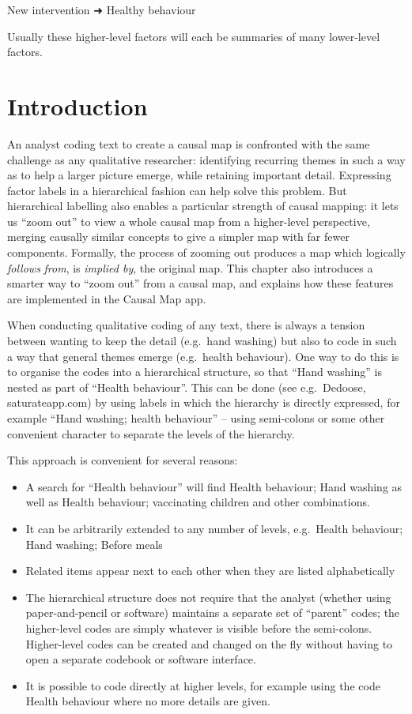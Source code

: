 \documentclass[
]{book}
\begin{document}
New intervention ➜ Healthy behaviour

Usually these higher-level factors will each be summaries of many lower-level factors.

\hypertarget{introduction}{%
\section{Introduction}\label{introduction}}

An analyst coding text to create a causal map is confronted with the same challenge as any qualitative researcher: identifying recurring themes in such a way as to help a larger picture emerge, while retaining important detail. Expressing factor labels in a hierarchical fashion can help solve this problem. But hierarchical labelling also enables a particular strength of causal mapping: it lets us ``zoom out'' to view a whole causal map from a higher-level perspective, merging causally similar concepts to give a simpler map with far fewer components. Formally, the process of zooming out produces a map which logically \emph{follows} \emph{from}, is \emph{implied by}, the original map. This chapter also introduces a smarter way to ``zoom out'' from a causal map, and explains how these features are implemented in the Causal Map app.

When conducting qualitative coding of any text, there is always a tension between wanting to keep the detail (e.g.~hand washing) but also to code in such a way that general themes emerge (e.g.~health behaviour). One way to do this is to organise the codes into a hierarchical structure, so that ``Hand washing'' is nested as part of ``Health behaviour''. This can be done (see e.g.~Dedoose, saturateapp.com) by using labels in which the hierarchy is directly expressed, for example ``Hand washing; health behaviour'' -- using semi-colons or some other convenient character to separate the levels of the hierarchy.

This approach is convenient for several reasons:

\begin{itemize}
\item
  A search for ``Health behaviour'' will find Health behaviour; Hand washing as well as Health behaviour; vaccinating children and other combinations.
\item
  It can be arbitrarily extended to any number of levels, e.g.~Health behaviour; Hand washing; Before meals
\item
  Related items appear next to each other when they are listed alphabetically
\item
  The hierarchical structure does not require that the analyst (whether using paper-and-pencil or software) maintains a separate set of ``parent'' codes; the higher-level codes are simply whatever is visible before the semi-colons. Higher-level codes can be created and changed on the fly without having to open a separate codebook or software interface.
\item
  It is possible to code directly at higher levels, for example using the code Health behaviour where no more details are given.
\end{itemize}
\end{document}
